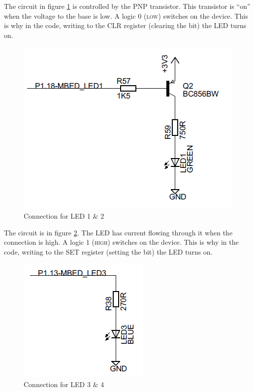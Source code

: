\documentclass[a4paper]{tufte-handout}
\begin{document}
  The
circuit in figure \ref{fig:led12} is controlled by the PNP transistor.
This transistor is ``on'' when the voltage to the base is low.  A
logic 0 (\textsc{low}) switches on the device.  This is why in the
code, writing to the \textsc{CLR} register (clearing the bit) the LED
turns on.
\begin{figure}
  \includegraphics{led12}
  \caption{Connection for LED 1 \& 2}
  \label{fig:led12}
\end{figure}

  The circuit
is in figure \ref{fig:led34}.  The LED has current flowing through it
when the connection is high.  A logic 1 (\textsc{high}) switches on
the device.  This is why in the code, writing to the \textsc{SET}
register (setting the bit) the LED turns on.
\begin{figure}
  \includegraphics{led34}
  \caption{Connection for LED 3 \& 4}
  \label{fig:led34}
\end{figure}
\end{document}
